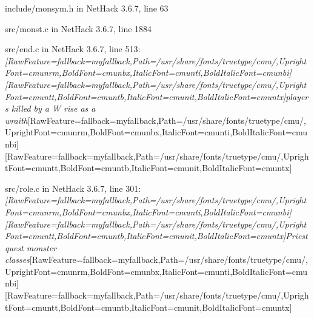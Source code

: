 \begin{myenumerate}
\item{} include/monsym.h in NetHack 3.6.7, line 63\footnotemark[56]
     

\item{} src/monst.c in NetHack 3.6.7, line 1884\footnotemark[57]
     

\item{} src/end.c in NetHack 3.6.7, line 513\footnotemark[58]: {\itshape \allowbreak{}\setmainfont{cmunti.ttf}[RawFeature={fallback=myfallback},Path=/usr/share/fonts/truetype/cmu/,UprightFont=cmunrm,BoldFont=cmunbx,ItalicFont=cmunti,BoldItalicFont=cmunbi]\setmonofont{cmunti.ttf}[RawFeature={fallback=myfallback},Path=/usr/share/fonts/truetype/cmu/,UprightFont=cmuntt,BoldFont=cmuntb,ItalicFont=cmunit,BoldItalicFont=cmuntx]\itshape players killed by a W rise as a wraith}\allowbreak{}\setmainfont{cmunrm.ttf}[RawFeature={fallback=myfallback},Path=/usr/share/fonts/truetype/cmu/,UprightFont=cmunrm,BoldFont=cmunbx,ItalicFont=cmunti,BoldItalicFont=cmunbi]\setmonofont{cmunrm.ttf}[RawFeature={fallback=myfallback},Path=/usr/share/fonts/truetype/cmu/,UprightFont=cmuntt,BoldFont=cmuntb,ItalicFont=cmunit,BoldItalicFont=cmuntx]
     

\item{} src/role.c in NetHack 3.6.7, line 301\footnotemark[59]: {\itshape \allowbreak{}\setmainfont{cmunti.ttf}[RawFeature={fallback=myfallback},Path=/usr/share/fonts/truetype/cmu/,UprightFont=cmunrm,BoldFont=cmunbx,ItalicFont=cmunti,BoldItalicFont=cmunbi]\setmonofont{cmunti.ttf}[RawFeature={fallback=myfallback},Path=/usr/share/fonts/truetype/cmu/,UprightFont=cmuntt,BoldFont=cmuntb,ItalicFont=cmunit,BoldItalicFont=cmuntx]\itshape Priest quest monster classes}\allowbreak{}\setmainfont{cmunrm.ttf}[RawFeature={fallback=myfallback},Path=/usr/share/fonts/truetype/cmu/,UprightFont=cmunrm,BoldFont=cmunbx,ItalicFont=cmunti,BoldItalicFont=cmunbi]\setmonofont{cmunrm.ttf}[RawFeature={fallback=myfallback},Path=/usr/share/fonts/truetype/cmu/,UprightFont=cmuntt,BoldFont=cmuntb,ItalicFont=cmunit,BoldItalicFont=cmuntx]
     


\end{myenumerate}
